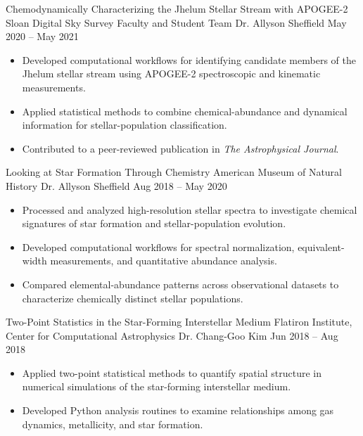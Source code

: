 \researchentry
  {Chemodynamically Characterizing the Jhelum Stellar Stream with APOGEE-2}
  {Sloan Digital Sky Survey Faculty and Student Team}
  {Dr. Allyson Sheffield}
  {May 2020 -- May 2021}

\begin{itemize}[
  leftmargin=1em,
  label={--},
  itemsep=3pt,
  topsep=0pt,
  parsep=0pt,
  partopsep=0pt
]
  \item Developed computational workflows for identifying candidate members of the Jhelum stellar stream using APOGEE-2 spectroscopic and kinematic measurements.

  \item Applied statistical methods to combine chemical-abundance and dynamical information for stellar-population classification.

  \item Contributed to a peer-reviewed publication in \textit{The Astrophysical Journal}.
\end{itemize}

\vspace{0.4em}

\researchentry
  {Looking at Star Formation Through Chemistry}
  {American Museum of Natural History}
  {Dr. Allyson Sheffield}
  {Aug 2018 -- May 2020}

\begin{itemize}[
  leftmargin=1em,
  label={--},
  itemsep=3pt,
  topsep=0pt,
  parsep=0pt,
  partopsep=0pt
]
  \item Processed and analyzed high-resolution stellar spectra to investigate chemical signatures of star formation and stellar-population evolution.

  \item Developed computational workflows for spectral normalization, equivalent-width measurements, and quantitative abundance analysis.

  \item Compared elemental-abundance patterns across observational datasets to characterize chemically distinct stellar populations.
\end{itemize}

\vspace{0.4em}

\researchentry
  {Two-Point Statistics in the Star-Forming Interstellar Medium}
  {Flatiron Institute, Center for Computational Astrophysics}
  {Dr. Chang-Goo Kim}
  {Jun 2018 -- Aug 2018}

\begin{itemize}[
  leftmargin=1em,
  label={--},
  itemsep=3pt,
  topsep=0pt,
  parsep=0pt,
  partopsep=0pt
]
  \item Applied two-point statistical methods to quantify spatial structure in numerical simulations of the star-forming interstellar medium.

  \item Developed Python analysis routines to examine relationships among gas dynamics, metallicity, and star formation.
\end{itemize}
